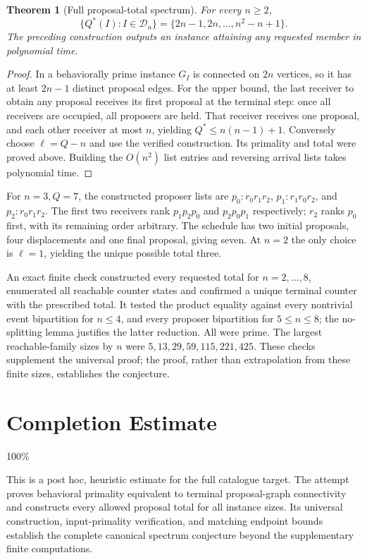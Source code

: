 \documentclass[11pt,a4paper]{article}
\newtheorem{theorem}{Theorem}[section]
\begin{document}
\begin{theorem}[Full proposal-total spectrum]
For every $n\ge2$,
\[
 \{Q^*(I):I\in\mathcal D_n\}
   =\{2n-1,2n,\ldots,n^2-n+1\}.
\]
The preceding construction outputs an instance attaining any requested member in polynomial time.
\end{theorem}
\begin{proof}
In a behaviorally prime instance $G_I$ is connected on $2n$ vertices, so it has at least $2n-1$ distinct proposal edges. For the upper bound, the last receiver to obtain any proposal receives its first proposal at the terminal step: once all receivers are occupied, all proposers are held. That receiver receives one proposal, and each other receiver at most $n$, yielding $Q^*\le n(n-1)+1$. Conversely choose $\ell=Q-n$ and use the verified construction. Its primality and total were proved above. Building the $O(n^2)$ list entries and reversing arrival lists takes polynomial time.
\end{proof}

For $n=3,Q=7$, the constructed proposer lists are
$p_0:r_0r_1r_2$, $p_1:r_1r_0r_2$, and $p_2:r_0r_1r_2$.
The first two receivers rank $p_1p_2p_0$ and $p_2p_0p_1$ respectively; $r_2$ ranks $p_0$ first, with its remaining order arbitrary. The schedule has two initial proposals, four displacements and one final proposal, giving seven. At $n=2$ the only choice is $\ell=1$, yielding the unique possible total three.

An exact finite check constructed every requested total for $n=2,\ldots,8$, enumerated all reachable counter states and confirmed a unique terminal counter with the prescribed total. It tested the product equality against every nontrivial event bipartition for $n\le4$, and every proposer bipartition for $5\le n\le8$; the no-splitting lemma justifies the latter reduction. All were prime. The largest reachable-family sizes by $n$ were $5,13,29,59,115,221,425$. These checks supplement the universal proof; the proof, rather than extrapolation from these finite sizes, establishes the conjecture.

\section{Completion Estimate}
100\%

This is a post hoc, heuristic estimate for the full catalogue target.
The attempt proves behavioral primality equivalent to terminal proposal-graph connectivity and constructs every allowed proposal total for all instance sizes. Its universal construction, input-primality verification, and matching endpoint bounds establish the complete canonical spectrum conjecture beyond the supplementary finite computations.
\end{document}
